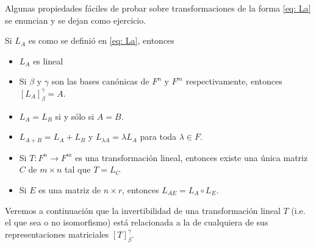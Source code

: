 Algunas propiedades fáciles de probar sobre transformaciones
de la forma \eqref{eq: La} se enuncian y se dejan como ejercicio.
\begin{prop}
Si $L_{A}$ es como se definió en \eqref{eq: La}, entonces
\begin{itemize}
	\item $L_{A}$ es lineal
	\item Si $\beta$ y $\gamma$ son las bases canónicas de
	$F^{n}$ y $F^{m}$ respectivamente, entonces $[L_{A}]_{\beta}^{\gamma} = A$.
	\item $L_{A} = L_{B}$ si y sólo si $A = B$.
	\item $L_{A + B} = L_{A} + L_{B}$ y $L_{\lambda A} = \lambda L_{A}$
	para toda $\lambda \in F$.
	\item Si $T: F^{n} \longrightarrow F^{m}$ es una transformación lineal,
	entonces existe una única matriz $C$ de $m \times n$ tal que 
	$T = L_{C}$
	\item Si $E$ es una matriz de $n \times r$, entonces
	$L_{AE} = L_{A} \circ L_{E}$.
\end{itemize} 
\end{prop}

Veremos a continuación que la invertibilidad de 
una transformación lineal
$T$ (i.e. el que sea o no isomorfismo) está 
relacionada a la de cualquiera de sus representaciones matriciales
$[T]_{\beta}^{\gamma}$.

